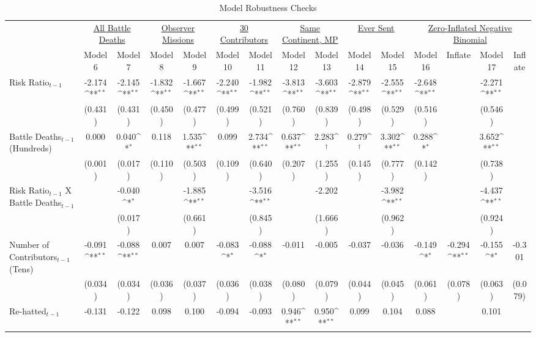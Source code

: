 \begin{table}[htbp]\centering
\fontsize{7}{7}\selectfont
\def\sym#1{\ifmmode^{#1}\else\(^{#1}\)\fi}
\caption{Model Robustness Checks}
\begin{tabular}{l*{14}{c}}
\hline\hline
&\multicolumn{2}{c}{\ul{All Battle Deaths}}&\multicolumn{2}{c}{\ul{Observer Missions}}&\multicolumn{2}{c}{\ul{30 Contributors}}&\multicolumn{2}{c}{\ul{Same Continent, MP}}&\multicolumn{2}{c}{\ul{Ever Sent}}&\multicolumn{4}{c}{\ul{Zero-Inflated Negative Binomial}}\\
[0.2em]
&\multicolumn{1}{c}{Model 6}&\multicolumn{1}{c}{Model 7}&\multicolumn{1}{c}{Model 8}&\multicolumn{1}{c}{Model 9}&\multicolumn{1}{c}{Model 10}&\multicolumn{1}{c}{Model 11}&\multicolumn{1}{c}{Model 12}&\multicolumn{1}{c}{Model 13}&\multicolumn{1}{c}{Model 14}&\multicolumn{1}{c}{Model 15}&\multicolumn{1}{c}{Model 16}&\multicolumn{1}{c}{Inflate}&\multicolumn{1}{c}{Model 17}&\multicolumn{1}{c}{Inflate}\\
[0.2em]
\hline
Risk Ratio$_{t-1}$ &-2.174\sym{**}&-2.145\sym{**}&-1.832\sym{**}&-1.667\sym{**}&-2.240\sym{**}&-1.982\sym{**}&-3.813\sym{**}&-3.603\sym{**}&-2.879\sym{**}&-2.555\sym{**}&-2.648\sym{**}&&-2.271\sym{**}\\
&(0.431)&(0.431)&(0.450)&(0.477)&(0.499)&(0.521)&(0.760)&(0.839)&(0.498)&(0.529)&(0.516)&&(0.546)\\
[0.5em]
Battle Deaths$_{t-1}$ (Hundreds) &0.000&0.040\sym{*}&0.118&1.535\sym{**}&0.099&2.734\sym{**}&0.637\sym{**}&2.283\sym{\dagger}&0.279\sym{\dagger}&3.302\sym{**}&0.288\sym{*}&&3.652\sym{**}\\
&(0.001)&(0.017)&(0.110)&(0.503)&(0.109)&(0.640)&(0.207)&(1.255)&(0.145)&(0.777)&(0.142)&&(0.738)\\
[0.5em]
Risk Ratio$_{t-1}$ X Battle Deaths$_{t-1}$ &&-0.040\sym{*}&&-1.885\sym{**}&&-3.516\sym{**}&&-2.202&&-3.982\sym{**}&&&-4.437\sym{**}\\
&&(0.017)&&(0.661)&&(0.845)&&(1.666)&&(0.962)&&&(0.924)\\
[0.5em]
Number of Contributors$_{t-1}$ (Tens) &-0.091\sym{**}&-0.088\sym{**}&0.007&0.007&-0.083\sym{*}&-0.088\sym{*}&-0.011&-0.005&-0.037&-0.036&-0.149\sym{*}&-0.294\sym{**}&-0.155\sym{*}&-0.301\\
&(0.034)&(0.034)&(0.036)&(0.037)&(0.036)&(0.038)&(0.080)&(0.079)&(0.044)&(0.045)&(0.061)&(0.078)&(0.063)&(0.079)\\
[0.5em]
Re-hatted$_{t-1}$ &-0.131&-0.122&0.098&0.100&-0.094&-0.093&0.946\sym{**}&0.950\sym{**}&0.099&0.104&0.088&&0.101\\

\end{tabular}
\end{table}
